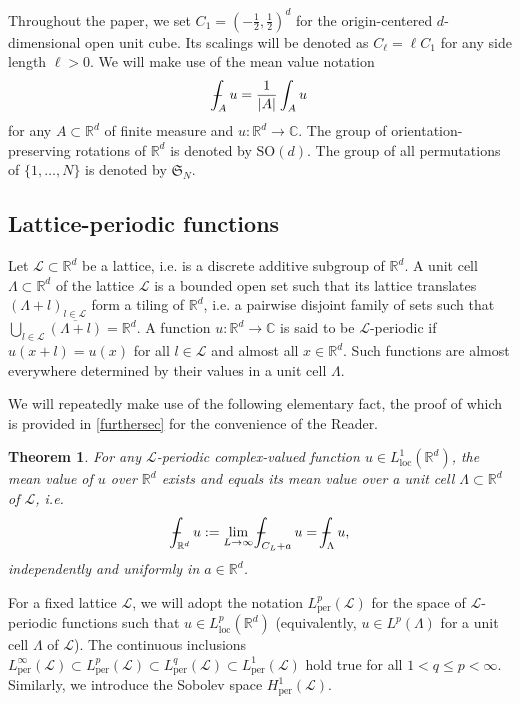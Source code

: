 \documentclass[final,onefignum,onetabnum,reqno]{amsart}
\newtheorem{theorem}{Theorem}[section]
\theoremstyle{remark}
\renewcommand{\le}{\leqslant}
\newcommand{\ol}[1]{\overline{#1}}
\newcommand{\RR}{\mathbb{R}}
\newcommand{\CC}{\mathbb{C}}
\newcommand{\SO}{\mathrm{SO}}
\newcommand{\per}{\mathrm{per}} %
\newcommand{\Lloc}{L_{\mathrm{loc}}} %
\def\Xint#1{\mathchoice
{\XXint\displaystyle\textstyle{#1}}%
{\XXint\textstyle\scriptstyle{#1}}%
{\XXint\scriptstyle\scriptscriptstyle{#1}}%
{\XXint\scriptscriptstyle\scriptscriptstyle{#1}}%
\!\int}
\def\XXint#1#2#3{{\setbox0=\hbox{$#1{#2#3}{\int}$ }
\vcenter{\hbox{$#2#3$ }}\kern-.6\wd0}}
\def\dashint{\Xint-}
\newcommand{\LC}{\mathcal{L}}
\newcommand{\SF}{\mathfrak{S}}
\begin{document}
Throughout the paper, we set $C_1=(-\frac{1}{2},\frac{1}{2})^d$ for the origin-centered $d$-dimensional open unit cube. Its scalings will be denoted as $C_\ell=\ell C_1$ for any side length $\ell>0$. 
We will make use of the mean value notation
$$
\dashint_A u=\frac{1}{|A|}\int_A u
$$
for any $A\subset\RR^d$ of finite measure and $u: \RR^d\to\CC$. 
The group of orientation-preserving rotations of $\RR^d$ is denoted by $\SO(d)$. The group of all permutations of $\{1,\ldots,N\}$ is denoted by $\SF_N$. 

\subsection{Lattice-periodic functions}
Let $\LC\subset\RR^d$ be a lattice, i.e. is a discrete additive subgroup of $\RR^d$.
A unit cell $\Lambda\subset\RR^d$ of the lattice $\LC$ is a bounded open set such that its lattice translates $(\Lambda+l)_{l\in\LC}$ form a tiling of $\RR^d$, i.e. a pairwise disjoint family of sets such that $\bigcup_{l\in\LC} \ol{(\Lambda+l)}=\RR^d$.
A function $u:\RR^d\to\CC$ is said to be $\LC$-periodic if $u(x+l)=u(x)$ for all $l\in\LC$ and almost all $x\in\RR^d$. Such functions are almost everywhere determined by their values in a unit cell $\Lambda$.

We will repeatedly make use of the following elementary fact, the proof of which is provided in \cref{furthersec} for the convenience of the Reader.
\begin{theorem}\label{permeanthm}
For any $\LC$-periodic complex-valued function $u\in\Lloc^1(\RR^d)$, the mean value of $u$ over $\RR^d$ exists and equals its mean value over a unit cell $\Lambda\subset\RR^d$ of $\LC$, i.e.
\begin{equation}\label{permean}
\dashint_{\RR^d} u:=\lim_{L\to\infty} \dashint_{C_L+a} u =\dashint_{\Lambda} u,
\end{equation}
independently and uniformly in $a\in\RR^d$.
\end{theorem}

For a fixed lattice $\LC$, we will adopt the notation $L_\per^p(\LC)$ for the space of $\LC$-periodic functions such that $u\in \Lloc^p(\RR^d)$ (equivalently, $u\in L^p(\Lambda)$ for a unit cell $\Lambda$ of $\LC$). The continuous inclusions $L^\infty_\per(\LC)\subset L^p_\per(\LC)\subset L^q_\per(\LC)\subset L^1_\per(\LC)$ hold true for all $1<q\le p<\infty$. Similarly, we introduce the Sobolev space $H^1_\per(\LC)$.
\end{document}

